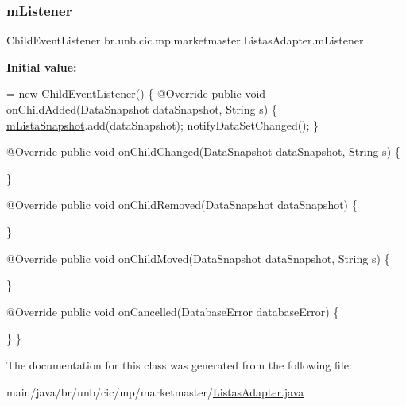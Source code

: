 \subsubsection{\texorpdfstring{m\+Listener}{mListener}}
{\footnotesize\ttfamily Child\+Event\+Listener br.\+unb.\+cic.\+mp.\+marketmaster.\+Listas\+Adapter.\+m\+Listener\hspace{0.3cm}{\ttfamily [private]}}

{\bfseries Initial value\+:}
\begin{DoxyCode}
= \textcolor{keyword}{new} ChildEventListener() \{
        @Override
        \textcolor{keyword}{public} \textcolor{keywordtype}{void} onChildAdded(DataSnapshot dataSnapshot, String s) \{
            \mbox{\hyperlink{classbr_1_1unb_1_1cic_1_1mp_1_1marketmaster_1_1ListasAdapter_adac21a98404a640aad7af15441697c3e}{mListaSnapshot}}.add(dataSnapshot);
            notifyDataSetChanged();
        \}

        @Override
        \textcolor{keyword}{public} \textcolor{keywordtype}{void} onChildChanged(DataSnapshot dataSnapshot, String s) \{

        \}

        @Override
        \textcolor{keyword}{public} \textcolor{keywordtype}{void} onChildRemoved(DataSnapshot dataSnapshot) \{

        \}

        @Override
        \textcolor{keyword}{public} \textcolor{keywordtype}{void} onChildMoved(DataSnapshot dataSnapshot, String s) \{

        \}

        @Override
        \textcolor{keyword}{public} \textcolor{keywordtype}{void} onCancelled(DatabaseError databaseError) \{

        \}
    \}
\end{DoxyCode}


The documentation for this class was generated from the following file\+:\begin{DoxyCompactItemize}
\item 
main/java/br/unb/cic/mp/marketmaster/\mbox{\hyperlink{ListasAdapter_8java}{Listas\+Adapter.\+java}}\end{DoxyCompactItemize}
